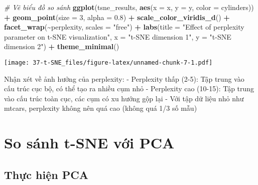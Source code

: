 \documentclass[
]{article}
\newenvironment{Shaded}{\begin{snugshade}}{\end{snugshade}}
\newcommand{\AttributeTok}[1]{\textcolor[rgb]{0.13,0.29,0.53}{#1}}
\newcommand{\CommentTok}[1]{\textcolor[rgb]{0.56,0.35,0.01}{\textit{#1}}}
\newcommand{\DecValTok}[1]{\textcolor[rgb]{0.00,0.00,0.81}{#1}}
\newcommand{\FloatTok}[1]{\textcolor[rgb]{0.00,0.00,0.81}{#1}}
\newcommand{\FunctionTok}[1]{\textcolor[rgb]{0.13,0.29,0.53}{\textbf{#1}}}
\newcommand{\NormalTok}[1]{#1}
\newcommand{\SpecialCharTok}[1]{\textcolor[rgb]{0.81,0.36,0.00}{\textbf{#1}}}
\newcommand{\StringTok}[1]{\textcolor[rgb]{0.31,0.60,0.02}{#1}}
\begin{document}
\begin{Shaded}
\begin{Highlighting}[]
\CommentTok{\# Vẽ biểu đồ so sánh}
\FunctionTok{ggplot}\NormalTok{(tsne\_results, }\FunctionTok{aes}\NormalTok{(}\AttributeTok{x =}\NormalTok{ x, }\AttributeTok{y =}\NormalTok{ y, }\AttributeTok{color =}\NormalTok{ cylinders)) }\SpecialCharTok{+}
  \FunctionTok{geom\_point}\NormalTok{(}\AttributeTok{size =} \DecValTok{3}\NormalTok{, }\AttributeTok{alpha =} \FloatTok{0.8}\NormalTok{) }\SpecialCharTok{+}
  \FunctionTok{scale\_color\_viridis\_d}\NormalTok{() }\SpecialCharTok{+}
  \FunctionTok{facet\_wrap}\NormalTok{(}\SpecialCharTok{\textasciitilde{}}\NormalTok{perplexity, }\AttributeTok{scales =} \StringTok{"free"}\NormalTok{) }\SpecialCharTok{+}
  \FunctionTok{labs}\NormalTok{(}\AttributeTok{title =} \StringTok{"Effect of perplexity parameter on t{-}SNE visualization"}\NormalTok{,}
       \AttributeTok{x =} \StringTok{"t{-}SNE dimension 1"}\NormalTok{,}
       \AttributeTok{y =} \StringTok{"t{-}SNE dimension 2"}\NormalTok{) }\SpecialCharTok{+}
  \FunctionTok{theme\_minimal}\NormalTok{()}
\end{Highlighting}
\end{Shaded}

\texttt{[image: 37-t-SNE\_files/figure-latex/unnamed-chunk-7-1.pdf]}

Nhận xét về ảnh hưởng của perplexity: - Perplexity thấp (2-5): Tập trung
vào cấu trúc cục bộ, có thể tạo ra nhiều cụm nhỏ - Perplexity cao
(10-15): Tập trung vào cấu trúc toàn cục, các cụm có xu hướng gộp lại -
Với tập dữ liệu nhỏ như mtcars, perplexity không nên quá cao (không quá
1/3 số mẫu)

\section{So sánh t-SNE với PCA}\label{so-suxe1nh-t-sne-vux1edbi-pca}

\subsection{Thực hiện PCA}\label{thux1ef1c-hiux1ec7n-pca}
\end{document}
